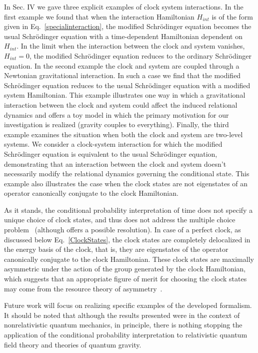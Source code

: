 \documentclass[a4paper,twocolumn,superscriptaddress,11pt,accepted=2019-06-04]{quantumarticle}
\begin{document}
{{In Sec. IV we gave three explicit examples of clock system interactions. In the first example we found that when the interaction Hamiltonian $H_{int}$ is of the form given in Eq.~\eqref{specialinteraction}, the modified Schr\"{o}dinger equation becomes the usual Schr\"{o}dinger equation with a time-dependent Hamiltonian dependent on $H_{int}$. In the limit when the interaction between the clock and system vanishes, $H_{int}=0$, the modified Schr\"{o}dinger equation reduces to the ordinary Schr\"{o}dinger equation. In the second example the clock and system are coupled through a Newtonian gravitational interaction. In such a case we find that the modified Schr\"{o}dinger equation reduces to the usual Schr\"{o}dinger equation with a modified system Hamiltonian. This example illustrates one way in which a gravitational interaction between the clock and system could affect the induced relational dynamics and offers a toy model in which the primary motivation for our investigation is realized (gravity couples to everything). Finally, the third example examines the situation when both the clock and system are two-level systems. We consider a clock-system interaction for which the modified Schr\"{o}dinger equation is equivalent to the usual Schr\"{o}dinger equation, demonstrating that an interaction between the clock and system doesn't necessarily modify the relational dynamics governing the conditional state.  This example also illustrates the case when the clock states are not eigenstates of an operator canonically conjugate to the clock Hamiltonian.}

As it stands, the conditional probability interpretation of time does not specify a unique choice of clock states, and thus does not address the multiple choice problem~\cite{Kuchar:2011} (although \cite{Marletto:2016} offers a possible resolution). In case of a perfect clock, as discussed below Eq.~\eqref{ClockStates}, the clock states are completely delocalized in the energy basis of the clock, that is, they are eigenstates of the operator canonically conjugate to the clock Hamiltonian. These clock states are maximally asymmetric under the action of the group generated by the clock Hamiltonian, which suggests that an appropriate figure of merit for choosing the clock states may come from the resource theory of asymmetry~{\cite{Bartlett:2007, Safranek2015}}.

Future work will focus on realizing specific examples of the developed formalism. It should be noted that although the results presented were in the context of nonrelativistic quantum mechanics, in principle, there is nothing stopping the application of the conditional probability interpretation to relativistic quantum field theory and theories of quantum gravity.

}
\end{document}
